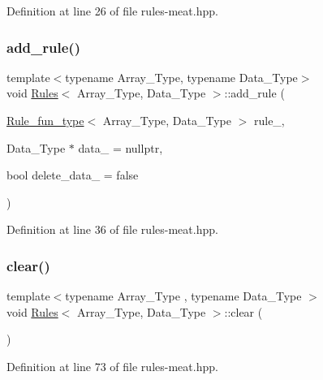 Definition at line 26 of file rules-\/meat.\+hpp.

\mbox{\label{class_rules_abbc63747014445b538384bb500464bb5}} 
\subsubsection{\texorpdfstring{add\+\_\+rule()}{add\_rule()}\hspace{0.1cm}{\footnotesize\ttfamily [3/3]}}
{\footnotesize\ttfamily template$<$typename Array\+\_\+\+Type, typename Data\+\_\+\+Type$>$ \\
void \hyperlink{class_rules}{Rules}$<$ Array\+\_\+\+Type, Data\+\_\+\+Type $>$\+::add\+\_\+rule (\begin{DoxyParamCaption}\item[{\hyperlink{typedefs_8hpp_a2e147c9c0e8b65be614c98a5dd400d5c}{Rule\+\_\+fun\+\_\+type}$<$ Array\+\_\+\+Type, Data\+\_\+\+Type $>$}]{rule\+\_\+,  }\item[{Data\+\_\+\+Type $\ast$}]{data\+\_\+ = {\ttfamily nullptr},  }\item[{bool}]{delete\+\_\+data\+\_\+ = {\ttfamily false} }\end{DoxyParamCaption})\hspace{0.3cm}{\ttfamily [inline]}}



Definition at line 36 of file rules-\/meat.\+hpp.

\mbox{\label{class_rules_a135a15d3ff70d4350d76a15f8e85f7df}} 
\subsubsection{\texorpdfstring{clear()}{clear()}}
{\footnotesize\ttfamily template$<$typename Array\+\_\+\+Type , typename Data\+\_\+\+Type $>$ \\
void \hyperlink{class_rules}{Rules}$<$ Array\+\_\+\+Type, Data\+\_\+\+Type $>$\+::clear (\begin{DoxyParamCaption}{ }\end{DoxyParamCaption})\hspace{0.3cm}{\ttfamily [inline]}}



Definition at line 73 of file rules-\/meat.\+hpp.

